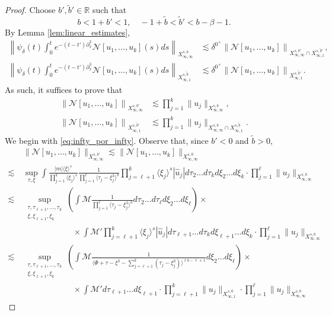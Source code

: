 \documentclass[%
11pt,  reqno]{amsart}
\newcommand{\jap}[1]{\langle #1 \rangle}
\newcommand{\5}{\textup{V}}
\newcommand{\les}{\lesssim}
\newcommand{\wt}{\widetilde}
\theoremstyle{remark}
\newcommand{\R}{\mathbb{R}}
\numberwithin{equation}{section}
\numberwithin{theorem}{section}
\newcommand{\Ncal}{\mathcal{N}}
\begin{document}
{		
		
		\begin{proof}
Choose $b', \tilde{b}'\in \R$ such that
$$
			 b < 1+b'< 1,\quad -1+\wt{b}<\wt{b}'<b-\beta-1.
			$$
        By Lemma \ref{lem:linear_estimates}, 
        \begin{align}
				\left\|\psi_\delta(t)\int_0^te^{-(t-t')\partial_x^3}\Ncal[u_1,\dots, u_k](s)ds \right\|_{X^{s,b}_{\infty, \infty}} & \les \delta^{0^+}\left\|\Ncal[u_1,\dots, u_k] \right\|_{X^{s,b'}_{\infty, \infty}\cap X^{s,\tilde{b}'}_{\infty, 1}}, \\
				\left\|\psi_\delta(t)\int_0^te^{-(t-t')\partial_x^3}\Ncal[u_1,\dots, u_k](s)ds \right\|_{X^{s,\wt{b}}_{\infty, 1}} & \les \delta^{0^+}\left\|\Ncal[u_1,\dots, u_k] \right\|_{X^{s,\tilde{b}'}_{\infty, 1}}.
			\end{align}
            As such, it suffices to prove that
\begin{align}
				\left\|\Ncal[u_1,\dots, u_k] \right\|_{X^{s,b'}_{\infty, \infty}} & \les \prod_{j=1}^k\|u_j\|_{X^{s,b}_{\infty, \infty}},\label{eq:infty_por_infty} \\
				\left\|\Ncal[u_1,\dots, u_k] \right\|_{X^{s,\wt{b}'}_{\infty, 1}}  & \les \prod_{j=1}^k\|u_j\|_{X^{s,b}_{\infty, \infty} \cap X^{s,\tilde{b}}_{\infty,1}}.\label{eq:1_por_infty}
			\end{align}
			We begin with \eqref{eq:infty_por_infty}. Observe that, since $b'<0$ and $\tilde{b}>0$,
			\begin{align*}
				&\|\Ncal[u_1,\dots, u_k] \|_{X^{s,b'}_{\infty, \infty}} \lesssim \|\Ncal[u_1,\dots, u_k] \|_{X^{s,0}_{\infty, \infty}} \\\lesssim \ &\sup_{\tau, \xi} \int \frac{|m|\jap{\xi}^s}{\prod_{j=1}^k\jap{\xi_j}^s} \frac{1}{\prod_{j=1}^\ell \jap{\tau_j-\xi_j^3}^b}\prod_{j=\ell+1}^k \jap{\xi_j}^s|\hat{u}_j| d\tau_2\dots d\tau_k d\xi_2 \dots d\xi_k\cdot \prod_{j=1}^\ell \|u_j\|_{X_{\infty,\infty}^{s,b}}
				\\\lesssim \ &\sup_{\substack{\tau, \tau_{\ell+1},\dots,\tau_k\\ \xi, \xi_{\ell+1}, \xi_k}} \left(\int \mathcal{M} \frac{1}{\prod_{j=1}^\ell \jap{\tau_j-\xi_j^3}^b}d\tau_2\dots d\tau_\ell d\xi_2\dots d\xi_\ell\right) \times\\ & \qquad \qquad \qquad \times \int \mathcal{M}'\prod_{j=\ell+1}^k \jap{\xi_j}^s|\hat{u}_j| d\tau_{\ell+1}\dots d\tau_k d\xi_{\ell+1} \dots d\xi_k\cdot \prod_{j=1}^\ell \|u_j\|_{X_{\infty,\infty}^{s,b}}
				\\\lesssim \ &\sup_{\substack{\tau, \tau_{\ell+1},\dots,\tau_k\\ \xi, \xi_{\ell+1}, \xi_k}} \left(\int \mathcal{M} \frac{1}{ \jap{\Phi + \tau-\xi^3 - \sum_{j=\ell+1}^k (\tau_j-\xi_j^3)}^{\ell b - \ell +1}} d\xi_2\dots d\xi_\ell\right) \times\\ & \qquad \qquad \qquad \times \int  \mathcal{M}' d\tau_{\ell+1}\dots  d\xi_{\ell+1}\cdot \prod_{j=\ell+1}^k \|u_j\|_{X_{\infty,1}^{s,0}}\cdot \prod_{j=1}^\ell \|u_j\|_{X_{\infty,\infty}^{s,b}}

\end{align*}
\end{proof}}
\end{document}
